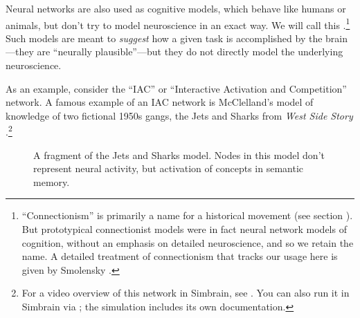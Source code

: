 
Neural networks are also used as cognitive models, which behave like humans or animals, but don't try to model neuroscience in an exact way. We will call this .\footnote{``Connectionism'' is primarily a name for a historical movement (see section ).  But prototypical connectionist models were in fact neural network models of cognition, without an emphasis on detailed neuroscience, and so we retain the name. A detailed treatment of connectionism that tracks our usage here is given by Smolensky \cite{smolensky1988proper}.}  Such models are meant to {\em suggest} how a given task is accomplished by the brain---they are ``neurally plausible''---but they do not directly model the underlying neuroscience.

As an example, consider the ``IAC'' or ``Interactive Activation and Competition'' network. A famous example of an IAC network is McClelland's model of knowledge of two fictional 1950s gangs, the Jets and Sharks from {\em West Side Story} \cite{mcclelland1981retrieving}.\footnote{For a video overview of this network in Simbrain, see . You can also run it in Simbrain via ; the simulation includes its own documentation.}

\begin{figure}[h]
\centering
{}
\caption[From McClelland and Rumelhart, 1989 \cite{mcclelland1989explorations}.]{A fragment of the Jets and Sharks model. Nodes in this model don't represent neural activity, but activation of concepts in semantic memory.}
\label{iac}
\end{figure}


